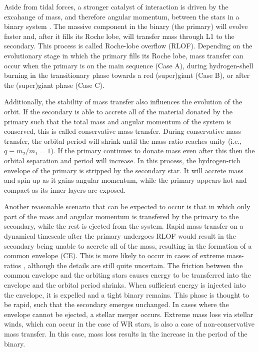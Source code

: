 Aside from tidal forces, a stronger catalyst of interaction is driven by the excahange of mass, and therefore angular momentum, between the stars in a binary system \citep[see, e.g.,][]{1967Paczynski,2013deMink,1992podsiadlowski}. The massive component in the binary (the primary) will evolve faster and, after it fills its Roche lobe, will transfer mass through L1 to the secondary. This process is called Roche-lobe overflow (RLOF). Depending on the evolutionary stage in which the primary fills its Roche lobe, mass transfer can occur when the primary is on the main sequence (Case A), during hydrogen-shell burning in the transitionary phase towards a red (super)giant (Case B), or after the (super)giant phase (Case C).

Additionally, the stability of mass transfer also influences the evolution of the orbit. If the secondary is able to accrete all of the material donated by the primary such that the total mass and angular momentum of the system is conserved, this is called conservative mass transfer. During conservative mass transfer, the orbital period will shrink until the mass-ratio reaches unity (i.e., $q \equiv m_2/m_1 = 1$). If the primary continues to donate mass even after this then the orbital separation and period will increase. In this process, the hydrogen-rich envelope of the primary is stripped by the secondary star. It will accrete mass and spin up as it gains angular momentum, while the primary appears hot and compact as its inner layers are exposed.

Another reasonable scenario that can be expected to occur is that in which only part of the mass and angular momentum is transfered by the primary to the secondary, while the rest is ejected from the system. Rapid mass transfer on a dynamical timescale after the primary undergoes RLOF would result in the secondary being unable to accrete all of the mass, resulting in the formation of a common envelope (CE). This is more likely to occur in cases of extreme mass-ratios \citep[see, e.g.,][]{ivanova_common_2013}, although the details are still quite uncertain. The friction between the common envelope and the orbiting stars causes energy to be transferred into the envelope and the orbital period shrinks. When sufficient energy is injected into the envelope, it is expelled and a tight binary remains. This phase is thought to be rapid, such that the secondary emerges unchanged. In cases where the envelope cannot be ejected, a stellar merger occurs. Extreme mass loss via stellar winds, which can occur in the case of WR stars, is also a case of non-conservative mass transfer. In this case, mass loss results in the increase in the period of the binary.

